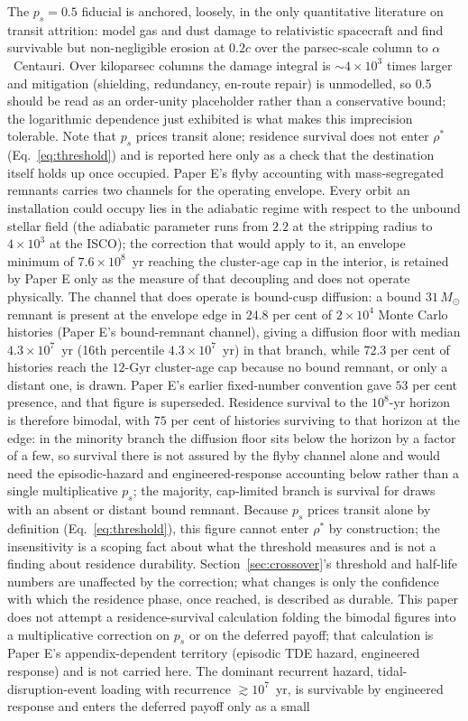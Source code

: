 \documentclass[11pt]{article}
\newcommand{\msun}{\ensuremath{M_\odot}}
\begin{document}
The $p_{s} = 0.5$ fiducial is anchored, loosely, in the only quantitative literature on transit attrition: \citet{Hoang2017} model gas and dust damage to relativistic spacecraft and find survivable but non-negligible erosion at $0.2c$ over the parsec-scale column to $\alpha$~Centauri. Over kiloparsec columns the damage integral is $\sim$$4\times10^{3}$ times larger and mitigation (shielding, redundancy, en-route repair) is unmodelled, so 0.5 should be read as an order-unity placeholder rather than a conservative bound; the logarithmic dependence just exhibited is what makes this imprecision tolerable. Note that $p_{s}$ prices transit alone; residence survival does not enter $\rho^{*}$ (Eq.~\ref{eq:threshold}) and is reported here only as a check that the destination itself holds up once occupied. Paper E's flyby accounting with mass-segregated remnants carries two channels for the operating envelope. Every orbit an installation could occupy lies in the adiabatic regime with respect to the unbound stellar field (the adiabatic parameter runs from $2.2$ at the stripping radius to $4\times10^{3}$ at the ISCO); the correction that would apply to it, an envelope minimum of $7.6\times10^{8}$~yr reaching the cluster-age cap in the interior, is retained by Paper E only as the measure of that decoupling and does not operate physically. The channel that does operate is bound-cusp diffusion: a bound $31\,\msun$ remnant is present at the envelope edge in $24.8$ per cent of $2\times10^{4}$ Monte Carlo histories (Paper E's bound-remnant channel), giving a diffusion floor with median $4.3\times10^{7}$~yr (16th percentile $4.3\times10^{7}$~yr) in that branch, while $72.3$ per cent of histories reach the $12$-Gyr cluster-age cap because no bound remnant, or only a distant one, is drawn. Paper E's earlier fixed-number convention gave $53$ per cent presence, and that figure is superseded. Residence survival to the $10^{8}$-yr horizon is therefore bimodal, with $75$ per cent of histories surviving to that horizon at the edge: in the minority branch the diffusion floor sits below the horizon by a factor of a few, so survival there is not assured by the flyby channel alone and would need the episodic-hazard and engineered-response accounting below rather than a single multiplicative $p_{s}$; the majority, cap-limited branch is survival for draws with an absent or distant bound remnant. Because $p_{s}$ prices transit alone by definition (Eq.~\ref{eq:threshold}), this figure cannot enter $\rho^{*}$ by construction; the insensitivity is a scoping fact about what the threshold measures and is not a finding about residence durability. Section~\ref{sec:crossover}'s threshold and half-life numbers are unaffected by the correction; what changes is only the confidence with which the residence phase, once reached, is described as durable. This paper does not attempt a residence-survival calculation folding the bimodal figures into a multiplicative correction on $p_s$ or on the deferred payoff; that calculation is Paper E's appendix-dependent territory (episodic TDE hazard, engineered response) and is not carried here. The dominant recurrent hazard, tidal-disruption-event loading with recurrence $\gtrsim 10^{7}$~yr, is survivable by engineered response and enters the deferred payoff only as a small 
\end{document}
